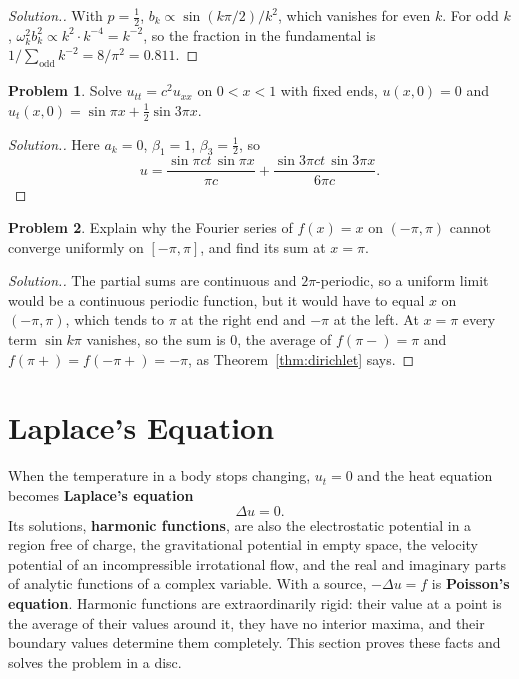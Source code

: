 \documentclass[11pt,a4paper]{article}
\numberwithin{equation}{section}
\theoremstyle{definition}
\newtheorem{problemx}{Problem}[subsection]
\newenvironment{problem}{\begin{problemx}}{\end{problemx}}
\newenvironment{solution}
  {\renewcommand{\qedsymbol}{}\begin{proof}[\textit{Solution}.]}
  {\end{proof}}
\begin{document}
\begin{solution}
With $p = \frac12$, $b_k \propto \sin(k\pi/2)/k^2$, which vanishes for even $k$. For odd $k$, $\omega_k^2b_k^2 \propto k^2\cdot k^{-4} = k^{-2}$, so the fraction in the fundamental is $1/\sum_{\text{odd}}k^{-2} = 8/\pi^2 = 0.811$.
\end{solution}

\begin{problem}
Solve $u_{tt} = c^2u_{xx}$ on $0 < x < 1$ with fixed ends, $u(x, 0) = 0$ and $u_t(x, 0) = \sin\pi x + \frac12\sin 3\pi x$.
\end{problem}

\begin{solution}
Here $a_k = 0$, $\beta_1 = 1$, $\beta_3 = \frac12$, so
\[
u = \frac{\sin\pi ct\,\sin\pi x}{\pi c} + \frac{\sin 3\pi ct\,\sin 3\pi x}{6\pi c} .
\]
\end{solution}

\begin{problem}
Explain why the Fourier series of $f(x) = x$ on $(-\pi, \pi)$ cannot converge uniformly on $[-\pi, \pi]$, and find its sum at $x = \pi$.
\end{problem}

\begin{solution}
The partial sums are continuous and $2\pi$-periodic, so a uniform limit would be a continuous periodic function, but it would have to equal $x$ on $(-\pi, \pi)$, which tends to $\pi$ at the right end and $-\pi$ at the left. At $x = \pi$ every term $\sin k\pi$ vanishes, so the sum is $0$, the average of $f(\pi-) = \pi$
and $f(\pi+) = f(-\pi+) = -\pi$, as Theorem~\ref{thm:dirichlet} says.
\end{solution}

\section{Laplace's Equation}
\label{sec:laplace}

When the temperature in a body stops changing, $u_t = 0$ and the heat equation becomes \textbf{Laplace's equation}
\[
\Delta u = 0 .
\]
Its solutions, \textbf{harmonic functions}, are also the electrostatic potential in a region free of charge, the gravitational potential in empty space, the velocity potential of an incompressible irrotational flow, and the real and imaginary parts of analytic functions of a complex variable. With a source,
$-\Delta u = f$ is \textbf{Poisson's equation}. Harmonic functions are extraordinarily rigid: their value at a point is the average of their values around it, they have no interior maxima, and their boundary values determine them completely. This section proves these facts and solves the problem in a disc.
\end{document}
